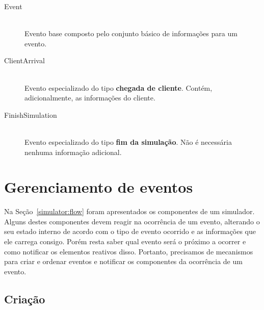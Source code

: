 \begin{description}
  \item[Event] \hfill \\
    Evento base composto pelo conjunto básico de informações para um evento.


  \item[ClientArrival] \hfill \\
    Evento especializado do tipo \textbf{chegada de cliente}. Contém,
    adicionalmente, as informações do cliente.


  \item[FinishSimulation] \hfill \\
    Evento especializado do tipo \textbf{fim da simulação}. Não é necessária
    nenhuma informação adicional.
\end{description}

\section{\label{sec:model:event}Gerenciamento de eventos}

Na Seção~\ref{simulator:flow} foram apresentados os componentes de um simulador.
Alguns destes componentes devem reagir na ocorrência de um evento, alterando o
seu estado interno de acordo com o tipo de evento ocorrido e as informações que
ele carrega consigo. Porém resta saber qual evento será o próximo a ocorrer e
como notificar os elementos reativos disso. Portanto, precisamos de mecanismos
para criar e ordenar eventos e notificar os componentes da ocorrência de um
evento.

\subsection{Criação} \label{model:event:creation}

